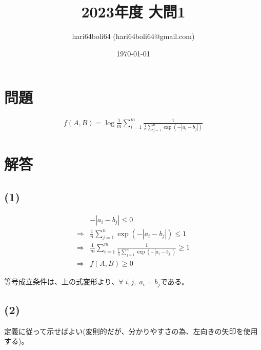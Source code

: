 \documentclass[a4paper, 10pt, dvipdfmx]{jlreq}
\begin{document}
\title{2023年度 大問1}
\author{hari64boli64 (hari64boli64@gmail.com)}
\date{\today}
\maketitle

\section{問題}

\begin{align*}
  f(A,B)=\log{
  \frac{1}{m}\sum_{i=1}^{m}{
  \frac{1}{\frac{1}{n}\sum_{j=1}^{n}{\exp(-|a_i-b_j|)}}}
  }
\end{align*}

\section{解答}

\subsection*{(1)}

\begin{align*}
              & -|a_i-b_j| \leq 0                                                                       \\
  \Rightarrow & \frac{1}{n}\sum_{j=1}^{n}{\exp(-|a_i-b_j|)} \leq 1                                      \\
  \Rightarrow & \frac{1}{m}\sum_{i=1}^{m}{\frac{1}{\frac{1}{n}\sum_{j=1}^{n}{\exp(-|a_i-b_j|)}}} \geq 1 \\
  \Rightarrow & f(A,B) \geq 0
\end{align*}

等号成立条件は、上の式変形より、$\forall \; i,j, \; a_i=b_j$である。

\subsection*{(2)}

定義に従って示せばよい(変則的だが、分かりやすさの為、左向きの矢印を使用する)。
\end{document}
